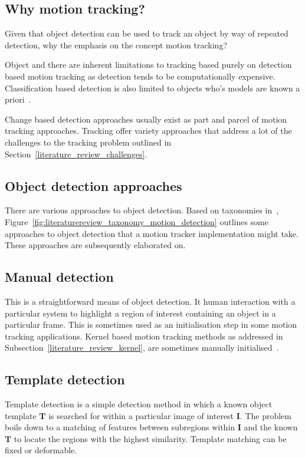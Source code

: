 \subsection{Why motion tracking?}
Given that object detection can be used to track an object by way of repeated
detection, why the emphasis on the concept motion tracking?

Object and there are inherent limitations to tracking based purely on
detection based motion tracking as detection tends to be computationally
expensive. Classification based detection is also limited to objects who's
models are known a priori~\cite{Forsyth2012}.

Change based detection approaches usually exist as part and parcel of motion
tracking approaches. Tracking offer variety approaches that address a lot of the
challenges to the tracking problem outlined in
Section~\ref{literature_review_challenges}.

\subsection{Object detection approaches}
There are various approaches to object detection. Based on taxonomies
in~\cite{Prajapati2015,Shantaiya2013}, 
Figure~\ref{fig:literaturereview_taxonomy_motion_detection} outlines some
approaches to object detection that a motion tracker implementation might take.
These approaches are subsequently elaborated on.


\subsection{Manual detection}
This is a straightforward means of object detection. It human interaction with a
particular system to highlight a region of interest containing an object in
a particular frame. This is sometimes used as an initialisation step in some
motion tracking applications. Kernel based motion tracking methods as addressed
in Subsection~\ref{literature_review_kernel}, are sometimes manually
initialised~\cite{Prajapati2015}.

\subsection{Template detection}
Template detection is a simple detection method in which a known object
template $\mathbf{T}$ is searched for within a particular image of interest
$\mathbf{I}$. The problem boils down to a matching of features between
subregions within $\mathbf{I}$ and the known $\mathbf{T}$ to locate the regions
with the highest similarity. Template matching can be fixed or deformable. 

